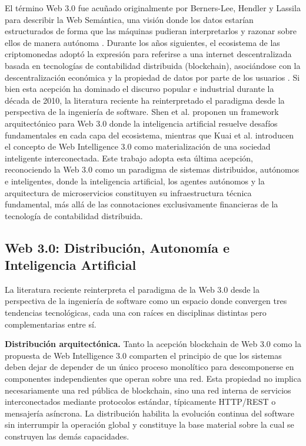 El t\'{e}rmino Web 3.0 fue acu\~{n}ado originalmente por Berners-Lee, Hendler y Lassila para describir la Web Sem\'{a}ntica, una visi\'{o}n donde los datos estar\'{i}an estructurados de forma que las m\'{a}quinas pudieran interpretarlos y razonar sobre ellos de manera aut\'{o}noma \cite{bernerslee2001semantic}. Durante los a\~{n}os siguientes, el ecosistema de las criptomonedas adopt\'{o} la expresi\'{o}n para referirse a una internet descentralizada basada en tecnolog\'{i}as de contabilidad distribuida (blockchain), asoci\'{a}ndose con la descentralizaci\'{o}n econ\'{o}mica y la propiedad de datos por parte de los usuarios \cite{edelman2021web3}. Si bien esta acepci\'{o}n ha dominado el discurso popular e industrial durante la d\'{e}cada de 2010, la literatura reciente ha reinterpretado el paradigma desde la perspectiva de la ingenier\'{i}a de software. Shen et al. \cite{shen2023aiweb3} proponen un framework arquitect\'{o}nico para Web 3.0 donde la inteligencia artificial resuelve desaf\'{i}os fundamentales en cada capa del ecosistema, mientras que Kuai et al. \cite{kuai2025wi30} introducen el concepto de Web Intelligence 3.0 como materializaci\'{o}n de una sociedad inteligente interconectada. Este trabajo adopta esta \'{u}ltima acepci\'{o}n, reconociendo la Web 3.0 como un paradigma de sistemas distribuidos, aut\'{o}nomos e inteligentes, donde la inteligencia artificial, los agentes aut\'{o}nomos y la arquitectura de microservicios constituyen su infraestructura t\'{e}cnica fundamental, m\'{a}s all\'{a} de las connotaciones exclusivamente financieras de la tecnolog\'{i}a de contabilidad distribuida.

\subsection{Web 3.0: Distribuci\'{o}n, Autonom\'{i}a e Inteligencia Artificial}

La literatura reciente reinterpreta el paradigma de la Web 3.0 desde la perspectiva de la ingenier\'{i}a de software como un espacio donde convergen tres tendencias tecnol\'{o}gicas, cada una con ra\'{i}ces en disciplinas distintas pero complementarias entre s\'{i}.

\textbf{Distribuci\'{o}n arquitect\'{o}nica.} Tanto la acepci\'{o}n blockchain de Web 3.0 \cite{edelman2021web3} como la propuesta de Web Intelligence 3.0 \cite{kuai2025wi30} comparten el principio de que los sistemas deben dejar de depender de un \'{u}nico proceso monol\'{i}tico para descomponerse en componentes independientes que operan sobre una red. Esta propiedad no implica necesariamente una red p\'{u}blica de blockchain, sino una red interna de servicios interconectados mediante protocolos est\'{a}ndar, t\'{i}picamente HTTP/REST o mensajer\'{i}a as\'{i}ncrona. La distribuci\'{o}n habilita la evoluci\'{o}n continua del software sin interrumpir la operaci\'{o}n global y constituye la base material sobre la cual se construyen las dem\'{a}s capacidades.

